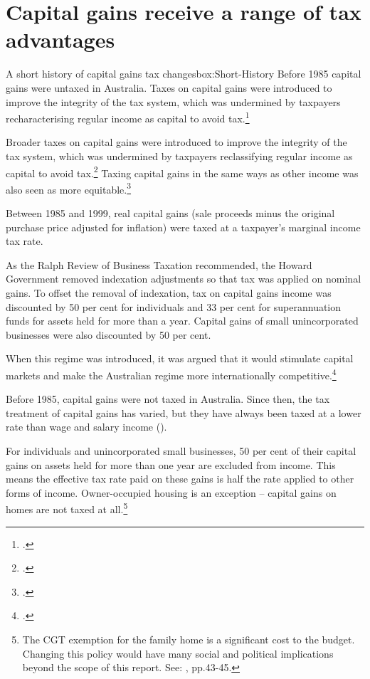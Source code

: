 \section{Capital gains receive a range of tax advantages}\label{sec:CG-receive-tax-advantages}
\begin{smallbox}[p]{A short history of capital gains tax changes}{box:Short-History}
Before 1985 capital gains were untaxed in Australia. Taxes on capital gains were introduced to improve the integrity of the tax system, which was undermined by taxpayers recharacterising regular income as capital to avoid tax.\footcite{ReinhardtSteel2006}

Broader taxes on capital gains were introduced to improve the integrity of the tax system, which was undermined by taxpayers reclassifying regular income as capital to avoid tax.\footcites{Evans2005}{Kenny2005} Taxing capital gains in the same ways as other income was also seen as more equitable.\footcite{AustralianGovernment1985}

Between 1985 and 1999, real capital gains (sale proceeds minus the original purchase price adjusted for inflation) were taxed at a taxpayer’s marginal income tax rate. 

As the Ralph Review of Business Taxation recommended, the Howard Government removed indexation adjustments so that tax was applied on nominal gains. To offset the removal of indexation, tax on capital gains income was discounted by 50 per cent for individuals and 33 per cent for superannuation funds for assets held for more than a year. Capital gains of small unincorporated businesses were also discounted by 50 per cent. 

When this regime was introduced, it was argued that it would stimulate capital markets and make the Australian regime more internationally competitive.\footcite[][14, 598]{RalphReview1999}
\end{smallbox}
Before 1985, capital gains were not taxed in Australia. Since then, the tax treatment of capital gains has varied, but they have always been taxed at a lower rate than wage and salary income (). 

For individuals and unincorporated small businesses, 50 per cent of their capital gains on assets held for more than one year are excluded from income. This means the effective tax rate paid on these gains is half the rate applied to other forms of income. Owner-occupied housing is an exception – capital gains on homes are not taxed at all.\footnote{The CGT exemption for the family home is a significant cost to the budget. Changing this policy would have many social and political implications beyond the scope of this report. See: \textcite{DaleyMcGannonSavageEtAl2013BalancingBudgets}, pp.43-45.}

